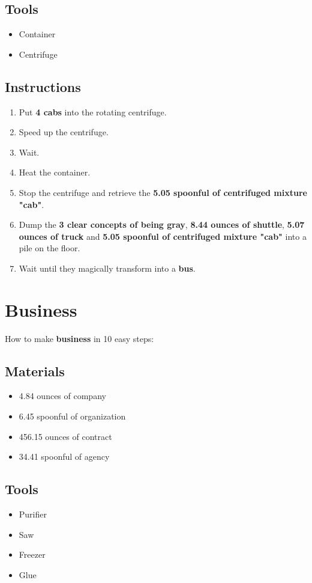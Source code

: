 \documentclass{article}
\begin{document}
\subsection{Tools}\begin{itemize}
\item 
Container
\item 
Centrifuge
\end{itemize}
\subsection{Instructions}\begin{enumerate}
\item 
Put \textbf{4 cabs} into the rotating centrifuge.
\item 
Speed up the centrifuge.
\item 
Wait.
\item 
Heat the container.
\item 
Stop the centrifuge and retrieve the \textbf{5.05 spoonful of centrifuged mixture "cab"}.
\item 
Dump the \textbf{3 clear concepts of being gray}, \textbf{8.44 ounces of shuttle}, \textbf{5.07 ounces of truck} and \textbf{5.05 spoonful of centrifuged mixture "cab"} into a pile on the floor.
\item 
Wait until they magically transform into a \textbf{bus}.
\end{enumerate}
\newpage
\section{Business}How to make \textbf{business} in 10 easy steps:

\subsection{Materials}\begin{itemize}
\item 
4.84 ounces of company
\item 
6.45 spoonful of organization
\item 
456.15 ounces of contract
\item 
34.41 spoonful of agency
\end{itemize}
\subsection{Tools}\begin{itemize}
\item 
Purifier
\item 
Saw
\item 
Freezer
\item 
Glue
\end{itemize}
\end{document}
